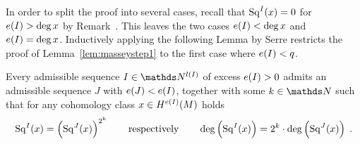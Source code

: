 In order to split the proof into several cases, recall that
$\mathrm{Sq}^{I}(x) = 0$ for $e(I)>\deg x$ by
Remark~. This leaves the two
cases $e(I)<\deg x$ and $e(I)=\deg x$.
Inductively applying the following Lemma by Serre restricts the
proof of Lemma~\ref{lem:masseystep1} to the first case where $e(I)<q$.
\begin{Lem}[Serre]
  \label{lem:serre}
  Every admissible sequence $I\in\Nat^{\l(I)}$ of excess $e(I)>0$
  admits an admissible sequence $J$ with $e(J)<e(I)$,
  together with some $k\in\Nat$
  such that for any cohomology class $x\in H^{e(I)}(M)$ holds
  \begin{gather*}
    \mathrm{Sq}^{I}(x) = \left(\mathrm{Sq}^{J}(x)\right) ^{2^k}
    \qquad\text{respectively}\qquad
    \deg\left(\mathrm{Sq}^{I}(x)\right) = 2^k\cdot \deg\left(\mathrm{Sq}^{J}(x)\right)
    \;.
  \end{gather*}
\end{Lem}

